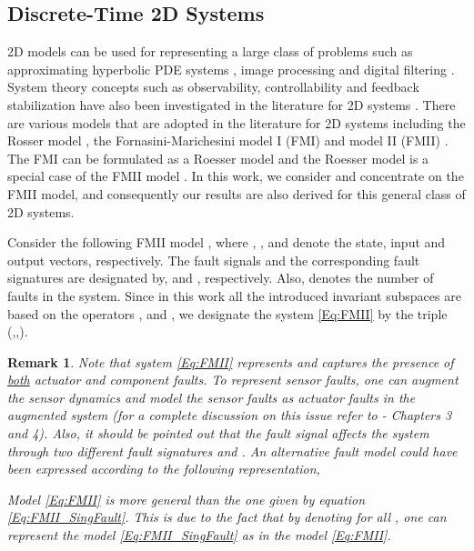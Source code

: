 \documentclass[journal,12pt,draftcls,onecolumn]{IEEEtran}
\def\QEDclosed{\hfill\IEEEQEDclosed}
\renewcommand{\qed}{\QEDclosed}
\newtheorem{remark}{Remark}
\begin{document}
\subsection{Discrete-Time 2D Systems} \label{Sec:Dis_2D}    2D models can be used for representing a large class of problems such as approximating hyperbolic PDE systems \cite{ACC2013, HyperPDE_2D}, image processing  and digital filtering \cite{Roess}. System theory concepts such as observability, controllability and feedback stabilization have also been investigated in the literature  for 2D systems \cite{Kaczorek_Book, FMinBook, ACC2013, ntogramatzidis2012Siam, Valcher2013}.
There are various models that are adopted in the literature for 2D systems including the Rosser model \cite{Roess}, the Fornasini-Marichesini model I (FMI) and model II (FMII) \cite{FMinBook,Kaczorek_Book}. The FMI can be formulated as a Roesser model and the Roesser model is a special case of the FMII model \cite{Kaczorek_Book}. In this work, we consider and concentrate on the FMII model, and consequently our results are also derived for this general class of 2D systems. 

Consider the following FMII model \cite{FMinBook}, 
where , , and  denote the state, input and output vectors, respectively. The fault signals and the corresponding fault signatures are designated by,  and , respectively. Also,  denotes the number of faults in the system. Since in this work all the introduced invariant subspaces are based on the operators ,  and , we designate the system \eqref{Eq:FMII} by the triple (,,). \begin{remark}\label{Rem:onFMII-General}
	Note that system \eqref{Eq:FMII} represents and captures the presence of \underline{both} actuator and component faults. To represent sensor faults, one can augment the sensor dynamics and model the sensor faults as actuator faults in the augmented system (for a complete discussion on this issue refer to \cite{Mass_Thesis} - Chapters 3 and 4). Also, it should be pointed out that the fault signal  affects the system through two different fault signatures  and . An alternative fault model could have been expressed according to the following representation,
	
	Model \eqref{Eq:FMII} is more general than the one given by equation  \eqref{Eq:FMII_SingFault}. This is due to the fact that by denoting   for all , one can represent the model \eqref{Eq:FMII_SingFault} as in the model \eqref{Eq:FMII}. \qed
\end{remark}
\end{document}

